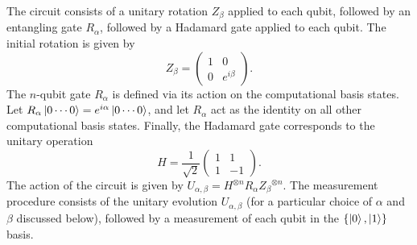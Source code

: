 \documentclass[amsmath,amssymb,superscriptaddress,pra,12pt]{revtex4-1}
\begin{document}
The circuit consists of a unitary rotation $Z_{\beta}$ applied to each qubit, followed by an entangling gate $R_{\alpha}$, followed by a Hadamard gate applied to each qubit. The initial rotation is given by
\begin{equation}
Z_\beta = \begin{pmatrix}1 & 0 \\ 0 & e^{i\beta}\end{pmatrix}.
\end{equation}
The $n$-qubit gate $R_\alpha$ is defined via its action on the computational basis states. Let $R_\alpha\ket{0\dotsm0} = e^{i\alpha}\ket{0\dotsm0}$, and let $R_\alpha$ act as the identity on all other computational basis states. Finally, the Hadamard gate corresponds to the unitary operation
\begin{equation}
H = \frac{1}{\sqrt 2}\begin{pmatrix}1 & 1 \\ 1 & -1\end{pmatrix}.
\end{equation}
The action of the circuit is given by $U_{\alpha,\beta} = H^{\otimes n} R_\alpha {Z_\beta}^{\otimes n}$.
The measurement procedure consists of the unitary evolution $U_{\alpha, \beta}$ (for a particular choice of $\alpha$ and $\beta$ discussed below), followed by a measurement of each qubit in the $\{\ket{0},\ket{1}\}$ basis.
\end{document}
